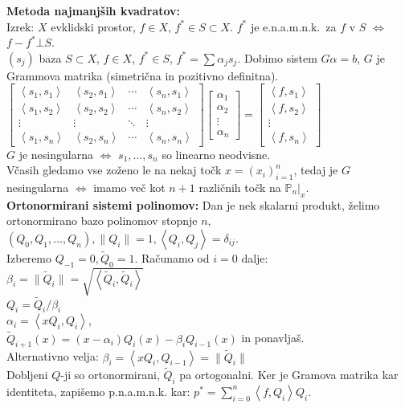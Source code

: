 \documentclass[a4paper,12pt]{article}
\theoremstyle{definition}
\def\P{\mathbb{P}}
\newcommand{\ls}{\left\langle}
\newcommand{\rs}{\right\rangle}
\begin{document}
 \textbf{Metoda najmanjših kvadratov:} \\
 Izrek: $X$ evklidski prostor, $f \in X$, $f^* \in S \subset X$. $f^*$ je e.n.a.m.n.k.\ za $f$ v $S$
$\iff$ $f - f^* \bot S$.\\
 $(s_j)$ baza $S \subset X$, $f \in X$, $f^* \in S$, $f^* = \sum \alpha_j s_j$. Dobimo sistem $G
\alpha = b$, $G$ je Grammova matrika (simetrična in pozitivno definitna).\\
$ \begin{bmatrix}
  \ls s_1,s_1\rs  & \ls s_2, s_1\rs  & \cdots & \ls s_n, s_1\rs  \\
  \ls s_1,s_2\rs  & \ls s_2, s_2\rs  & \cdots & \ls s_n, s_2\rs  \\
  \vdots & \vdots & \ddots & \vdots \\
  \ls s_1,s_n\rs  & \ls s_2, s_n\rs  & \cdots & \ls s_n, s_n\rs
 \end{bmatrix}
 \begin{bmatrix}
  \alpha_1 \\ \alpha_2 \\ \vdots \\ \alpha_n
 \end{bmatrix}  = \begin{bmatrix}
 \ls f, s_1\rs  \\ \ls f, s_2\rs  \\ \vdots \\ \ls f, s_n\rs
 \end{bmatrix}$\\
 $G$ je nesingularna $\iff$ $s_1, \ldots, s_n$ so linearno neodvisne.\\
 Včasih gledamo vse zoženo le na nekaj točk $x = (x_i)_{i=1}^n$, tedaj je $G$ nesingularna $\iff$
imamo več kot $n+1$ različnih točk na $\P_n|_x$.\\
 \textbf{Ortonormirani sistemi polinomov:}
 Dan je nek skalarni produkt, želimo ortonormirano bazo polinomov stopnje $n$,
 $(Q_0, Q_1, \ldots, Q_n), \|Q_i\| = 1, \ls Q_i, Q_j\rs  = \delta_{ij}$.  \\
 Izberemo $Q_{-1} = 0, \tilde{Q}_0 = 1$. Računamo od $i=0$ dalje: \\
 $\beta_i = \|\tilde{Q}_i\| = \sqrt{\ls \tilde{Q}_i, \tilde{Q}_i \rs}$\\
 $Q_i = \tilde{Q}_i/\beta_i$ \\
 $\alpha_i = \ls xQ_i, Q_i\rs$, \\
 $\tilde{Q}_{i+1}(x) = (x - \alpha_i) Q_i(x) - \beta_i Q_{i-1}(x)$ in ponavljaš. \\
 Alternativno velja:
 $\beta_i = \ls x Q_i, Q_{i-1}\rs  = \|\tilde{Q}_i\|$ \\
Dobljeni $Q$-ji so ortonormirani, $\tilde{Q}_i$ pa ortogonalni.
Ker je Gramova matrika kar identiteta, zapišemo p.n.a.m.n.k. kar:
$p^* = \sum_{i=0}^n \ls f, Q_i \rs Q_i$.
\end{document}
